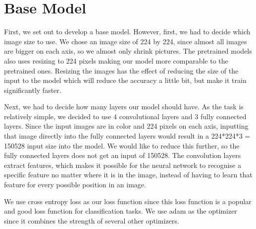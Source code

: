 \section{Base Model}
First, we set out to develop a base model. However, first, we had to decide which image size to use.
We chose an image size of 224 by 224, since almost all images are bigger on each axis, so we almost only shrink pictures.
The pretrained models also uses resizing to 224 pixels making our model more comparable to the pretrained ones.
Resizing the images has the effect of reducing the size of the input to the model which will reduce the accuracy a little bit, but make it train significantly faster.

Next, we had to decide how many layers our model should have.
As the task is relatively simple, we decided to use 4 convolutional layers and 3 fully connected layers.
Since the input images are in color and 224 pixels on each axis, inputting that image directly into the fully connected layers would result in a 224*224*3 = 150528 input size into the model. We would like to reduce this further, so the fully connected layers does not get an input of 150528. The convolution layers extract features, which makes it possible for the neural network to recognise a specific feature no matter where it is in the image, instead of having to learn that feature for every possible position in an image.

We use cross entropy loss as our loss function since this loss function is a popular and good loss function for classification tasks. We use adam as the optimizer since it combines the strength of several other optimizers. 


